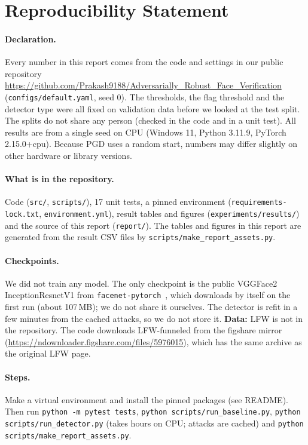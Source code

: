 \section{Reproducibility Statement}
\label{sec:repro}
\paragraph{Declaration.} Every number in this report comes from the code and settings in our public repository \url{https://github.com/Prakash9188/Adversarially_Robust_Face_Verification} (\texttt{configs/default.yaml}, seed 0). The thresholds, the flag threshold and the detector type were all fixed on validation data before we looked at the test split. The splits do not share any person (checked in the code and in a unit test). All results are from a single seed on CPU (Windows 11, Python 3.11.9, PyTorch 2.15.0+cpu). Because PGD uses a random start, numbers may differ slightly on other hardware or library versions.

\paragraph{What is in the repository.} Code (\texttt{src/}, \texttt{scripts/}), 17 unit tests, a pinned environment (\texttt{requirements-lock.txt}, \texttt{environment.yml}), result tables and figures (\texttt{experiments/results/}) and the source of this report (\texttt{report/}). The tables and figures in this report are generated from the result CSV files by \texttt{scripts/make\_report\_assets.py}.

\paragraph{Checkpoints.} We did not train any model. The only checkpoint is the public VGGFace2 InceptionResnetV1 from \texttt{facenet-pytorch}~\cite{esler2019facenetpytorch}, which downloads by itself on the first run (about 107\,MB); we do not share it ourselves. The detector is refit in a few minutes from the cached attacks, so we do not store it. \textbf{Data:} LFW is not in the repository. The code downloads LFW-funneled from the figshare mirror (\url{https://ndownloader.figshare.com/files/5976015}), which has the same archive as the original LFW page.

\paragraph{Steps.} Make a virtual environment and install the pinned packages (see README). Then run \texttt{python -m pytest tests}, \texttt{python scripts/run\_baseline.py}, \texttt{python scripts/run\_detector.py} (takes hours on CPU; attacks are cached) and \texttt{python scripts/make\_report\_assets.py}.

